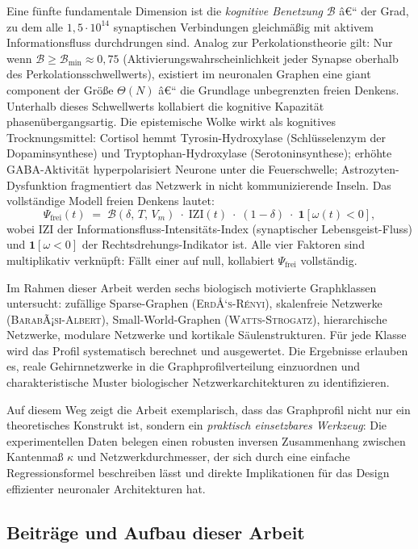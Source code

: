 ﻿\documentclass[a4paper,12pt]{article}
\theoremstyle{definition}
\begin{document}
	Eine fünfte fundamentale Dimension ist die \emph{kognitive Benetzung} $\mathcal{B}$ â€“ der Grad, zu dem alle $1{,}5 \cdot 10^{14}$ synaptischen Verbindungen gleichmäßig mit aktivem Informationsfluss durchdrungen sind. Analog zur Perkolationstheorie gilt: Nur wenn $\mathcal{B} \geq \mathcal{B}_{\min} \approx 0{,}75$ (Aktivierungswahrscheinlichkeit jeder Synapse oberhalb des Perkolationsschwellwerts), existiert im neuronalen Graphen eine giant component der Größe $\Theta(N)$ â€“ die Grundlage unbegrenzten freien Denkens. Unterhalb dieses Schwellwerts kollabiert die kognitive Kapazität phasenübergangsartig. Die epistemische Wolke wirkt als kognitives Trocknungsmittel: Cortisol hemmt Tyrosin-Hydroxylase (Schlüsselenzym der Dopaminsynthese) und Tryptophan-Hydroxylase (Serotoninsynthese); erhöhte GABA-Aktivität hyperpolarisiert Neurone unter die Feuerschwelle; Astrozyten-Dysfunktion fragmentiert das Netzwerk in nicht kommunizierende Inseln. Das vollständige Modell freien Denkens lautet:
	\[
	\Psi_{\mathrm{frei}}(t) \;=\; \mathcal{B}(\delta,\,T,\,V_m) \;\cdot\; \mathrm{IZI}(t) \;\cdot\; (1-\delta) \;\cdot\; \mathbf{1}[\omega(t) < 0],
	\]
	wobei $\mathrm{IZI}$ der Informationsfluss-Intensitäts-Index (synaptischer Lebensgeist-Fluss) und $\mathbf{1}[\omega < 0]$ der Rechtsdrehungs-Indikator ist. Alle vier Faktoren sind multiplikativ verknüpft: Fällt einer auf null, kollabiert $\Psi_{\mathrm{frei}}$ vollständig.

	Im Rahmen dieser Arbeit werden sechs biologisch motivierte Graphklassen untersucht: zufällige Sparse-Graphen (\textsc{ErdÅ‘s-Rényi}), skalenfreie Netzwerke (\textsc{BarabÃ¡si-Albert}), Small-World-Graphen (\textsc{Watts-Strogatz}), hierarchische Netzwerke, modulare Netzwerke und kortikale Säulenstrukturen. Für jede Klasse wird das Profil systematisch berechnet und ausgewertet. Die Ergebnisse erlauben es, reale Gehirnnetzwerke in die Graphprofilverteilung einzuordnen und charakteristische Muster biologischer Netzwerkarchitekturen zu identifizieren.

	Auf diesem Weg zeigt die Arbeit exemplarisch, dass das Graphprofil nicht nur ein theoretisches Konstrukt ist, sondern ein \emph{praktisch einsetzbares Werkzeug}: Die experimentellen Daten belegen einen robusten inversen Zusammenhang zwischen Kantenmaß $\kappa$ und Netzwerkdurchmesser, der sich durch eine einfache Regressionsformel beschreiben lässt und direkte Implikationen für das Design effizienter neuronaler Architekturen hat.

	\subsection{Beiträge und Aufbau dieser Arbeit}
\end{document}
